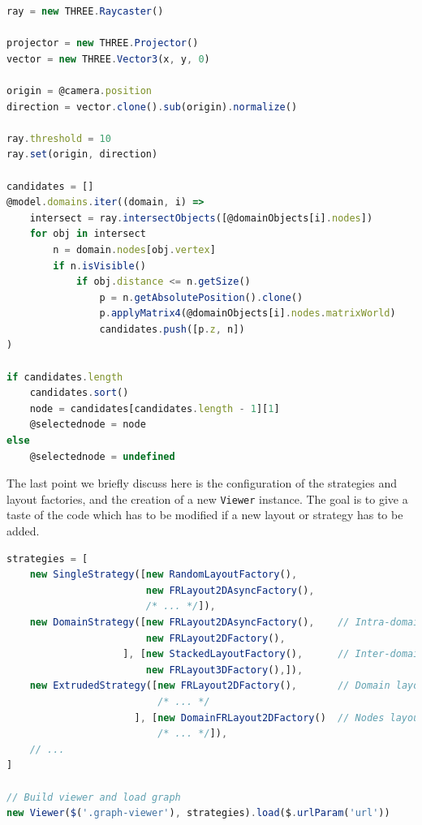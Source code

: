 \begin{lstlisting}[caption={Raytracing technique used to detect the active node.},label=lst:raytracing,language=javascript]
ray = new THREE.Raycaster()

projector = new THREE.Projector()
vector = new THREE.Vector3(x, y, 0)

origin = @camera.position
direction = vector.clone().sub(origin).normalize()

ray.threshold = 10
ray.set(origin, direction)

candidates = []
@model.domains.iter((domain, i) =>
    intersect = ray.intersectObjects([@domainObjects[i].nodes])
    for obj in intersect
        n = domain.nodes[obj.vertex]
        if n.isVisible()
            if obj.distance <= n.getSize()
                p = n.getAbsolutePosition().clone()
                p.applyMatrix4(@domainObjects[i].nodes.matrixWorld)
                candidates.push([p.z, n])
)

if candidates.length
    candidates.sort()
    node = candidates[candidates.length - 1][1]
    @selectednode = node
else
    @selectednode = undefined
\end{lstlisting}

The last point we briefly discuss here is the configuration of the strategies and layout factories, and the creation of a new \texttt{Viewer} instance. The goal is to give a taste of the code which has to be modified if a new layout or strategy has to be added.

\begin{lstlisting}[caption={Construction of a viewer instance.},label=lst:viewer,language=javascript]
strategies = [
    new SingleStrategy([new RandomLayoutFactory(),
                        new FRLayout2DAsyncFactory(),
                        /* ... */]),
    new DomainStrategy([new FRLayout2DAsyncFactory(),    // Intra-domain layouts
                        new FRLayout2DFactory(),
                    ], [new StackedLayoutFactory(),      // Inter-domain layouts
                        new FRLayout3DFactory(),]),
    new ExtrudedStrategy([new FRLayout2DFactory(),       // Domain layouts
                          /* ... */
                      ], [new DomainFRLayout2DFactory()  // Nodes layouts
                          /* ... */]),
    // ...
]

// Build viewer and load graph
new Viewer($('.graph-viewer'), strategies).load($.urlParam('url'))
\end{lstlisting}


